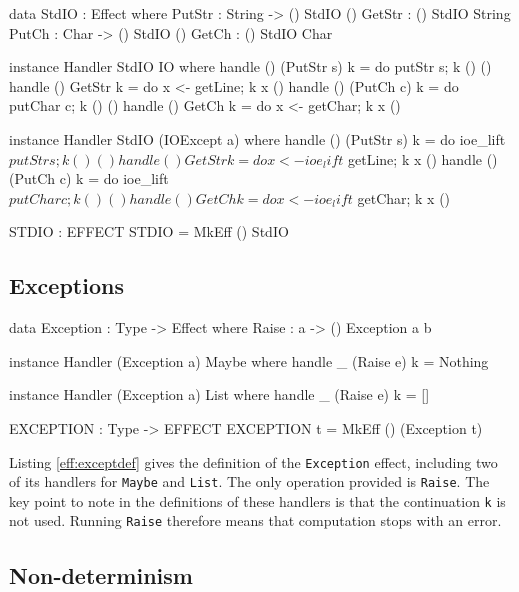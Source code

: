 \begin{code}[float=h,frame=single, caption={Console I/O Effect Definition}, label=eff:stdiodef]
data StdIO : Effect where
     PutStr : String -> { () } StdIO () 
     GetStr : { () } StdIO String 
     PutCh : Char -> { () } StdIO ()
     GetCh : { () } StdIO Char

instance Handler StdIO IO where
    handle () (PutStr s) k = do putStr s; k () ()
    handle () GetStr     k = do x <- getLine; k x ()
    handle () (PutCh c)  k = do putChar c; k () () 
    handle () GetCh      k = do x <- getChar; k x ()

instance Handler StdIO (IOExcept a) where
    handle () (PutStr s) k = do ioe_lift $ putStr s; k () ()
    handle () GetStr     k = do x <- ioe_lift $ getLine; k x ()
    handle () (PutCh c)  k = do ioe_lift $ putChar c; k () () 
    handle () GetCh      k = do x <- ioe_lift $ getChar; k x ()

STDIO : EFFECT
STDIO = MkEff () StdIO
\end{code}

\subsection{Exceptions}

\begin{code}[float=h,frame=single, caption={Exception Effect Definition}, label=eff:exceptdef]
data Exception : Type -> Effect where 
     Raise : a -> { () } Exception a b

instance Handler (Exception a) Maybe where
     handle _ (Raise e) k = Nothing

instance Handler (Exception a) List where
     handle _ (Raise e) k = []

EXCEPTION : Type -> EFFECT
EXCEPTION t = MkEff () (Exception t)
\end{code}

Listing \ref{eff:exceptdef} gives the definition of the \texttt{Exception}
effect, including two of its handlers for \texttt{Maybe} and \texttt{List}.
The only operation provided is \texttt{Raise}. 
%
The key point to note in the definitions of these handlers is that the
continuation \texttt{k} is not used. Running \texttt{Raise} therefore means
that computation stops with an error.

\subsection{Non-determinism}

